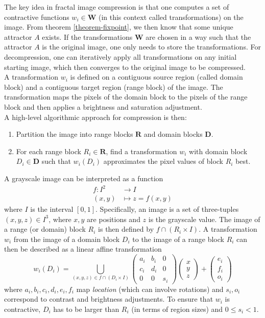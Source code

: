 The key idea in fractal image compression is that one computes a set of contractive functions $w_i \in \boldsymbol{W}$ (in this context called transformations) on the image.
From theorem \ref{theorem-fixpoint}, we then know that some unique attractor $A$ exists. If the transformations $\boldsymbol{W}$ are chosen in a way such that the attractor $A$ is the original image,
one only needs to store the transformations. For decompression, one can iteratively apply all transformations on any initial starting image, which then converges to the original image to be compressed.\\
A transformation $w_i$ is defined on a contiguous source region (called domain block) and a contiguous target region (range block) of the image.
The transformation maps the pixels of the domain block to the pixels of the range block and then applies a brightness and saturation adjustment.\\
A high-level algorithmic approach for compression is then:
\begin{enumerate}
    \item Partition the image into range blocks $\boldsymbol{R}$ and domain blocks $\boldsymbol{D}$.
    \item For each range block $R_i \in \boldsymbol{R}$, find a transformation $w_i$ with domain block $D_i \in \boldsymbol{D}$
            such that $w_i(D_i)$ approximates the pixel values of block $R_i$ best.
\end{enumerate}
A grayscale image can be interpreted as a function
\begin{align*}
    f \colon I^2 &\to I\\
    (x,y) &\mapsto z = f(x,y)
\end{align*}
where $I$ is the interval $[0,1]$. Specifically, an image is a set of three-tuples $(x,y,z) \in I^3$, where $x,y$ are positions and $z$ is the grayscale value.
The image of a range (or domain) block $R_i$ is then defined by $f \cap (R_i \times I)$.
A transformation $w_i$ from the image of a domain block $D_i$ to the image of a range block $R_i$ can then be described as a linear affine transformation
$$
w_i(D_i) = \bigcup_{(x,y,z) \in f \cap (D_i \times I)} \begin{pmatrix} a_i & b_i & 0 \\ c_i & d_i & 0 \\ 0 & 0 & s_i \end{pmatrix} \begin{pmatrix} x\\y\\z \end{pmatrix} + \begin{pmatrix} e_i\\f_i\\o_i \end{pmatrix}
$$
where $a_i, b_i, c_i, d_i, e_i, f_i$ map \textit{location} (which can involve rotations) and $s_i, o_i$ correspond to contrast and brightness adjustments.
To ensure that $w_i$ is contractive, $D_i$ has to be larger than $R_i$ (in terms of region sizes) and $0 \leq s_i < 1$.

